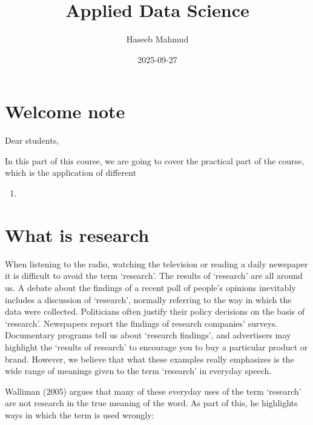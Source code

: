 \documentclass[
  letterpaper,
  DIV=11,
  numbers=noendperiod]{scrreprt}
\title{Applied Data Science}
\author{Haseeb Mahmud}
\date{2025-09-27}
\providecommand{\tightlist}{%
  \setlength{\itemsep}{0pt}\setlength{\parskip}{0pt}}\usepackage{longtable,booktabs,array}
\renewcommand*\contentsname{Table of contents}
\newcommand\contentsname{Table of contents}
\begin{document}
\maketitle

\renewcommand*\contentsname{Table of contents}
{
\hypersetup{linkcolor=}
\setcounter{tocdepth}{2}
\tableofcontents
}

\chapter*{Welcome note}\label{welcome-note}


Dear students,

In this part of this course, we are going to cover the practical part of
the course, which is the application of different

\begin{enumerate}
\def\labelenumi{\arabic{enumi}.}
\tightlist
\item
\end{enumerate}


\chapter{What is research}\label{what-is-research}

When listening to the radio, watching the television or reading a daily
newspaper it is difficult to avoid the term `research'. The results of
`research' are all around us. A debate about the findings of a recent
poll of people's opinions inevitably includes a discussion of
`research', normally referring to the way in which the data were
collected. Politicians often justify their policy decisions on the basis
of `research'. Newspapers report the findings of research companies'
surveys. Documentary programs tell us about `research findings', and
advertisers may highlight the `results of research' to encourage you to
buy a particular product or brand. However, we believe that what these
examples really emphasizes is the wide range of meanings given to the
term `research' in everyday speech.

Walliman (2005) argues that many of these everyday uses of the term
`research' are not research in the true meaning of the word. As part of
this, he highlights ways in which the term is used wrongly:
\end{document}
